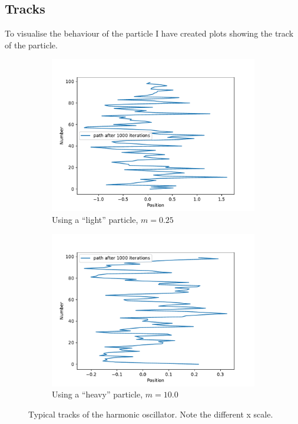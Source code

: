 \documentclass{scrartcl}
\begin{document}
	\subsection{Tracks}
		To visualise the behaviour of the particle I have created plots showing the track of the particle.
		\begin{figure}[H]
			\centering
				\begin{subfigure}[c]{0.49\textwidth}
					\includegraphics[width=\textwidth]{../imgs/harmonic_oscillator_track/track_1000100_track_1000.pdf}
					\caption{Using a \enquote{light} particle, $m=0.25$}
					\label{fig:harmonic_oscillator_track_1000100_track_1000_light}
				\end{subfigure}
				\begin{subfigure}[c]{0.49\textwidth}
					\includegraphics[width=\textwidth]{../imgs/harmonic_oscillator_track/track_1000100_heavy_track_1000.pdf}
					\caption{Using a \enquote{heavy} particle, $m=10.0$}
					\label{fig:harmonic_oscillator_track_1000100_track_1000_heavy}
				\end{subfigure}
			\caption{Typical tracks of the harmonic oscillator. Note the different x scale.}
			\label{fig:harmonic_oscillator_track_1000100_track_1000}
		\end{figure}
\end{document}
